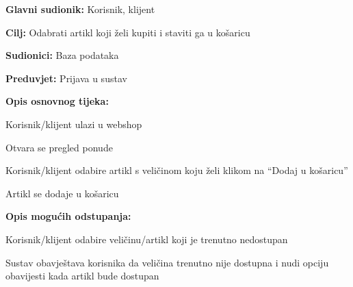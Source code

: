 				\noindent {}
				\begin{packed_item}
					
					\item \textbf{Glavni sudionik: } Korisnik, klijent
					\item  \textbf{Cilj:} Odabrati artikl koji želi kupiti i staviti ga u košaricu
					\item  \textbf{Sudionici:} Baza podataka
					\item  \textbf{Preduvjet:}  Prijava u sustav
					\item  \textbf{Opis osnovnog tijeka:}
					
					\item[] \begin{packed_enum}
						\item Korisnik/klijent ulazi u webshop
						\item Otvara se pregled ponude
						\item Korisnik/klijent odabire artikl s veličinom koju želi klikom na “Dodaj u košaricu”
						\item Artikl se dodaje u košaricu
					\end{packed_enum}
					\item  \textbf{Opis mogućih odstupanja:}
					\item[] \begin{packed_item}
						\item[3.a]      Korisnik/klijent odabire veličinu/artikl koji je trenutno nedostupan
						\item[] \begin{packed_enum}
							\item         Sustav obavještava korisnika da veličina trenutno nije dostupna i nudi opciju obavijesti kada artikl bude dostupan
						\end{packed_enum}
					\end{packed_item}
				\end{packed_item}
				
